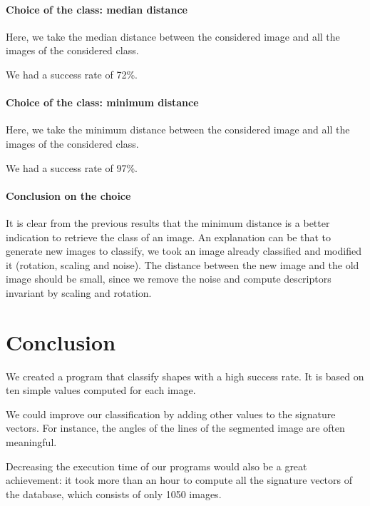 \documentclass[a4paper,12pt]{article}
\theoremstyle{example}
\theoremstyle{remark}
\theoremstyle{definition}
\begin{document}
\paragraph{Choice of the class: median distance}

Here, we take the median distance between the considered image and all the images of the considered class.

We had a success rate of 72\%.

\paragraph{Choice of the class: minimum distance}

Here, we take the minimum distance between the considered image and all the images of the considered class.

We had a success rate of 97\%.

\paragraph{Conclusion on the choice}

It is clear from the previous results that the minimum distance is a better indication to retrieve the class of an image. An explanation can be that to generate new images to classify, we took an image already classified and modified it (rotation, scaling and noise). The distance between the new image and the old image should be small, since we remove the noise and compute descriptors invariant by scaling and rotation.


\section{Conclusion}

We created a program that classify shapes with a high success rate. It is based on ten simple values computed for each image.

We could improve our classification by adding other values to the signature vectors. For instance, the angles of the lines of the segmented image are often meaningful.

Decreasing the execution time of our programs would also be a great achievement: it took more than an hour to compute all the signature vectors of the database, which consists of only 1050 images.
\end{document}
